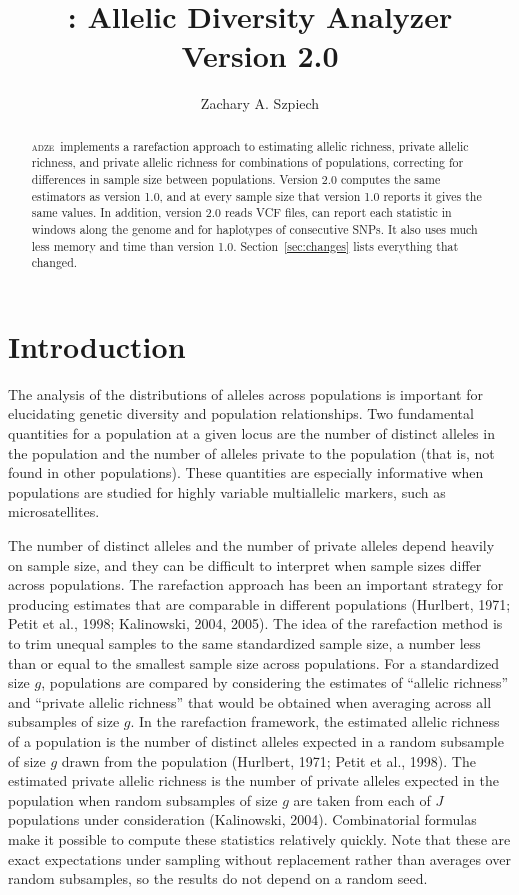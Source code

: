 \documentclass[11pt]{article}
\title{\prog: Allelic Diversity Analyzer\\Version 2.0}
\author{
  Zachary A. Szpiech
}
\date{}
\newcommand{\prog}{\textsc{adze}}
\begin{document}
\maketitle

\begin{abstract}
\noindent
\prog\ implements a rarefaction approach to estimating allelic richness,
private allelic richness, and private allelic richness for combinations of
populations, correcting for differences in sample size between populations.
Version 2.0 computes the same estimators as version 1.0, and at every sample
size that version 1.0 reports it gives the same values. In addition, version
2.0 reads VCF files, can report
each statistic in windows along the genome and for haplotypes of consecutive
SNPs. It also uses much less memory and time than version 1.0.
Section~\ref{sec:changes} lists everything that changed.
\end{abstract}

\tableofcontents
\newpage

\section{Introduction}
\label{sec:intro}

The analysis of the distributions of alleles across populations is important
for elucidating genetic diversity and population relationships. Two
fundamental quantities for a population at a given locus are the number of
distinct alleles in the population and the number of alleles private to the
population (that is, not found in other populations). These quantities are
especially informative when populations are studied for highly variable
multiallelic markers, such as microsatellites.

The number of distinct alleles and the number of private alleles depend
heavily on sample size, and they can be difficult to interpret when sample
sizes differ across populations. The rarefaction approach has been an
important strategy for producing estimates that are comparable in different
populations (Hurlbert, 1971; Petit et al., 1998; Kalinowski, 2004, 2005). The
idea of the rarefaction method is to trim unequal samples to the same
standardized sample size, a number less than or equal to the smallest sample
size across populations. For a standardized size $g$, populations are compared
by considering the estimates of ``allelic richness'' and ``private allelic
richness'' that would be obtained when averaging across all subsamples of size
$g$. In the rarefaction framework, the estimated allelic richness of a
population is the number of distinct alleles expected in a random subsample of
size $g$ drawn from the population (Hurlbert, 1971; Petit et al., 1998). The
estimated private allelic richness is the number of private alleles expected
in the population when random subsamples of size $g$ are taken from each of
$J$ populations under consideration (Kalinowski, 2004). Combinatorial formulas
make it possible to compute these statistics relatively quickly. Note that
these are exact expectations under sampling without replacement rather than
averages over random subsamples, so the results do not depend on a random
seed.
\end{document}
